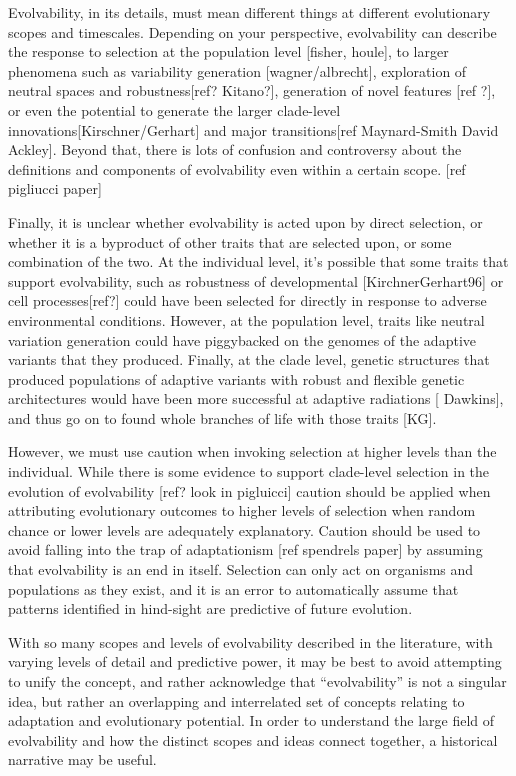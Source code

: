 Evolvability, in its details, must mean different things at different evolutionary scopes and timescales. Depending on your perspective, evolvability can describe the response to selection at the population level [fisher, houle], to larger phenomena such as variability generation [wagner/albrecht], exploration of neutral spaces and robustness[ref? Kitano?], generation of novel features [ref ?], or even the potential to generate the larger clade-level innovations[Kirschner/Gerhart] and major transitions[ref Maynard-Smith David Ackley]. Beyond that, there is lots of confusion and controversy about the definitions and components of evolvability even within a certain scope. [ref pigliucci paper]

Finally, it is unclear whether evolvability is acted upon by direct selection, or whether it is a byproduct of other traits that are selected upon, or some combination of the two. At the individual level, it’s possible that some traits that support evolvability, such as robustness of developmental [KirchnerGerhart96] or cell processes[ref?] could have been selected for directly in response to adverse environmental conditions. However, at the population level, traits like neutral variation generation could have piggybacked on the genomes of the adaptive variants that they produced. Finally, at the clade level, genetic structures that produced populations of adaptive variants with robust and flexible genetic architectures would have been more successful at adaptive radiations [ Dawkins], and thus go on to found whole branches of life with those traits [KG]. 

However, we must use caution when invoking selection at higher levels than the individual. While there is some evidence to support clade-level selection in the evolution of evolvability [ref? look in pigluicci] caution should be applied when attributing evolutionary outcomes to higher levels of selection when random chance or  lower levels are adequately explanatory. Caution should be used to avoid falling into the trap of adaptationism [ref spendrels paper] by assuming that evolvability is an end in itself. Selection can only act on organisms and populations as they exist, and it is an error to automatically assume that patterns identified in hind-sight are predictive of future evolution.

With so many scopes and levels of evolvability described in the literature, with varying levels of detail and predictive power, it may be best to avoid attempting to unify the concept, and rather acknowledge that “evolvability” is not a singular idea, but rather an overlapping and interrelated set of concepts relating to adaptation and evolutionary potential. In order to understand the large field of evolvability and how the distinct scopes and ideas connect together, a historical narrative may be useful.

